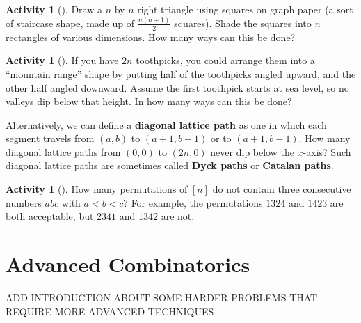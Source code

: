 \documentclass[10pt,]{book}
\newcommand{\terminology}[1]{\textbf{#1}}
\theoremstyle{plain}
\theoremstyle{definition}
\theoremstyle{definition}
\theoremstyle{definition}
\newtheorem{activity}[project]{Activity}
\numberwithin{equation}{chapter}
\newcommand{\lt}{<}
\begin{document}
\begin{activity}[]\label{activity-186}
\hypertarget{p-1057}{}%
Draw a \(n\) by \(n\) right triangle using squares on graph paper (a sort of staircase shape, made up of \(\frac{n(n+1)}{2}\) squares).  Shade the squares into \(n\) rectangles of various dimensions.  How many ways can this be done?%
\end{activity}
\begin{activity}[]\label{activity-187}
\hypertarget{p-1058}{}%
If you have \(2n\) toothpicks, you could arrange them into a ``mountain range'' shape by putting half of the toothpicks angled upward, and the other half angled downward.  Assume the first toothpick starts at sea level, so no valleys dip below that height. In how many ways can this be done?%
\par
\hypertarget{p-1059}{}%
Alternatively, we can define a \terminology{diagonal lattice path} as one in which each segment travels from \((a,b)\) to \((a+1, b+1)\) or to \((a+1, b-1)\).  How many diagonal lattice paths from \((0,0)\) to \((2n,0)\) never dip below the \(x\)-axis?  Such diagonal lattice paths are sometimes called \terminology{Dyck paths} or \terminology{Catalan paths}.%
\end{activity}
\begin{activity}[]\label{activity-188}
\hypertarget{p-1060}{}%
How many permutations of \([n]\) do not contain three consecutive numbers \(abc\) with \(a \lt b \lt c\)?  For example, the permutations \(1324\) and \(1423\) are both acceptable, but \(2341\) and \(1342\) are not.%
\end{activity}
\typeout{************************************************}
\typeout{************************************************}
\chapter[{Advanced Combinatorics}]{Advanced Combinatorics}\label{ch_advanced}
\hypertarget{p-1061}{}%
ADD INTRODUCTION ABOUT SOME HARDER PROBLEMS THAT REQUIRE MORE ADVANCED TECHNIQUES%
\typeout{************************************************}
\typeout{************************************************}
\end{document}
